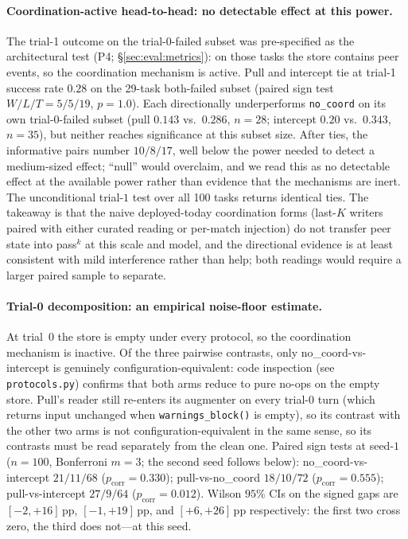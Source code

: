 \paragraph{Coordination-active head-to-head: no detectable
effect at this power.}
The trial-1 outcome on the trial-0-failed subset was pre-specified
as the architectural test (P4; \S\ref{sec:eval:metrics}): on those
tasks the store contains peer events, so the coordination
mechanism is active. Pull and intercept tie at trial-1 success
rate $0.28$ on the 29-task both-failed subset (paired sign test
$W/L/T=5/5/19$, $p=1.0$). Each directionally underperforms
\texttt{no\_coord} on its own trial-0-failed subset (pull $0.143$
vs.\ $0.286$, $n{=}28$; intercept $0.20$ vs.\ $0.343$, $n{=}35$),
but neither reaches significance at this subset size. After
ties, the informative pairs number $10/8/17$, well below the
power needed to detect a medium-sized effect; ``null'' would
overclaim, and we read this as no detectable effect at the
available power rather than evidence that the mechanisms are
inert. The unconditional trial-$1$ test over all 100 tasks
returns identical ties. The takeaway is that the naive
deployed-today coordination forms (last-$K$ writers paired with
either curated reading or per-match injection) do not transfer
peer state into pass$^k$ at this scale and model, and the
directional evidence is at least consistent with mild
interference rather than help; both readings would require a
larger paired sample to separate.

\paragraph{Trial-0 decomposition: an empirical noise-floor estimate.}
At trial~0 the store is empty under every protocol, so the
coordination mechanism is inactive. Of the three pairwise
contrasts, only no\_coord-vs-intercept is genuinely
configuration-equivalent: code inspection (see
\texttt{protocols.py}) confirms that both arms reduce to
pure no-ops on the empty store. Pull's reader still re-enters
its augmenter on every trial-$0$ turn (which returns input
unchanged when \texttt{warnings\_block()} is empty), so its
contrast with the other two arms is not configuration-equivalent
in the same sense, so its contrasts must be read separately
from the clean one.
Paired sign tests at seed-$1$ ($n{=}100$, Bonferroni $m{=}3$;
the second seed follows below):
no\_coord-vs-intercept $21/11/68$
($p_{\text{corr}}{=}0.330$); pull-vs-no\_coord $18/10/72$
($p_{\text{corr}}{=}0.555$); pull-vs-intercept $27/9/64$
($p_{\text{corr}}{=}0.012$). Wilson $95\%$ CIs on the signed
gaps are $[{-}2,{+}16]$\,pp, $[{-}1,{+}19]$\,pp, and $[{+}6,{+}26]$\,pp
respectively: the first two cross zero, the third does not---at
this seed.


